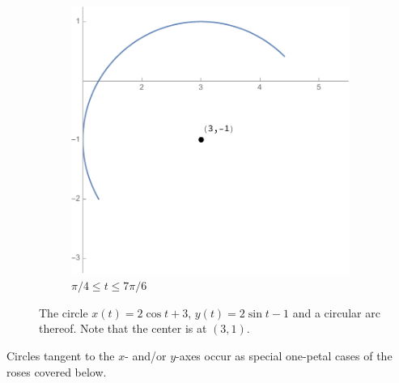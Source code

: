 \documentclass[12pt]{article}
\begin{document}
\begin{figure}[h!]
\begin{subfigure}[t]{0.5\textwidth}
			\includegraphics[scale=0.65]{2_Circles2}
			\caption{$\pi/4\leq t\leq 7\pi/6$}
		\end{subfigure}
		\caption{The circle $x(t)=2\cos{t}+3$, $y(t)=2\sin{t}-1$ and a circular arc thereof. Note that the center is at $(3,1)$.}
		\label{fig:circle}
	\end{figure}

	\noindent Circles tangent to the $x$- and/or $y$-axes occur as special one-petal cases of the roses covered below.
	
\end{document}
